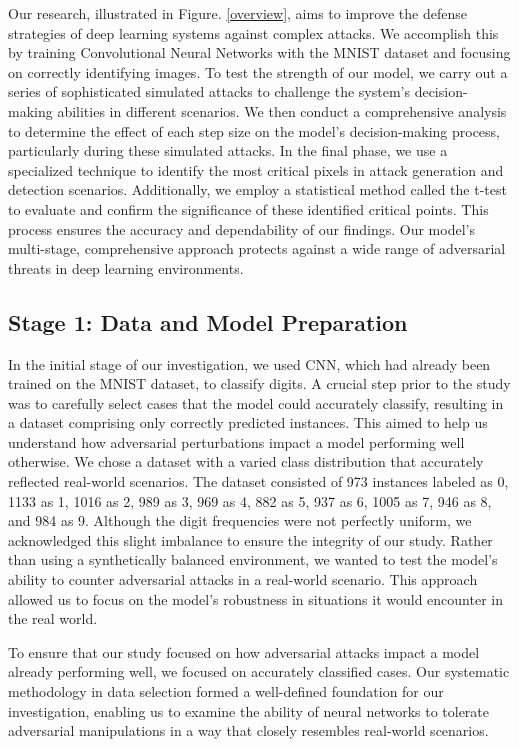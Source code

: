 \documentclass[10pt, conference, a4paper, final]{IEEEtran}
\begin{document}
Our research, illustrated in Figure. \ref{overview}, aims to improve the defense strategies of deep learning systems against complex attacks. We accomplish this by training Convolutional Neural Networks with the MNIST dataset and focusing on correctly identifying images. To test the strength of our model, we carry out a series of sophisticated simulated attacks to challenge the system's decision-making abilities in different scenarios. We then conduct a comprehensive analysis to determine the effect of each step size on the model's decision-making process, particularly during these simulated attacks. In the final phase, we use a specialized technique to identify the most critical pixels in attack generation and detection scenarios. Additionally, we employ a statistical method called the t-test to evaluate and confirm the significance of these identified critical points. This process ensures the accuracy and dependability of our findings. Our model's multi-stage, comprehensive approach protects against a wide range of adversarial threats in deep learning environments.


\subsection{Stage 1: Data and Model Preparation}

In the initial stage of our investigation, we used CNN, which had already been trained on the MNIST dataset, to classify digits. A crucial step prior to the study was to carefully select cases that the model could accurately classify, resulting in a dataset comprising only correctly predicted instances. This aimed to help us understand how adversarial perturbations impact a model performing well otherwise.
We chose a dataset with a varied class distribution that accurately reflected real-world scenarios. The dataset consisted of 973 instances labeled as 0, 1133 as 1, 1016 as 2, 989 as 3, 969 as 4, 882 as 5, 937 as 6, 1005 as 7, 946 as 8, and 984 as 9. Although the digit frequencies were not perfectly uniform, we acknowledged this slight imbalance to ensure the integrity of our study. Rather than using a synthetically balanced environment, we wanted to test the model's ability to counter adversarial attacks in a real-world scenario. This approach allowed us to focus on the model's robustness in situations it would encounter in the real world.

To ensure that our study focused on how adversarial attacks impact a model already performing well, we focused on accurately classified cases. Our systematic methodology in data selection formed a well-defined foundation for our investigation, enabling us to examine the ability of neural networks to tolerate adversarial manipulations in a way that closely resembles real-world scenarios.
\end{document}
